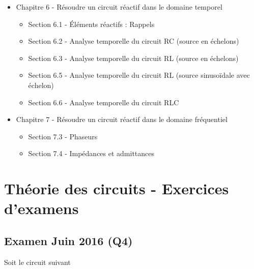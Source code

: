 \begin{itemize}
	\item Chapitre 6 - Résoudre un circuit réactif dans le domaine temporel
	    \begin{itemize}
	        \item Section 6.1 - Éléments réactifs : Rappels 
		    \item Section 6.2 - Analyse temporelle du circuit RC (source en échelons)
		    \item Section 6.3 - Analyse temporelle du circuit RL (source en échelons)
		    \item Section 6.5 - Analyse temporelle du circuit RL (source sinusoïdale avec échelon)
		    \item Section 6.6 - Analyse temporelle du circuit RLC
	    \end{itemize}
	\item Chapitre 7 - Résoudre un circuit réactif dans le domaine fréquentiel
	    \begin{itemize}
	        \item Section 7.3 - Phaseurs
		    \item Section 7.4 - Impédances et admittances
	    \end{itemize}
\end{itemize}

\vspace{5pt}

\newpage

\section{Théorie des circuits - Exercices d'examens}
\subsection{Examen Juin 2016 (Q4)}

Soit le circuit suivant \\


